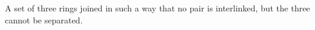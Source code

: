  A set of three rings joined in such a way that 
no pair is interlinked, but the three cannot be separated.
